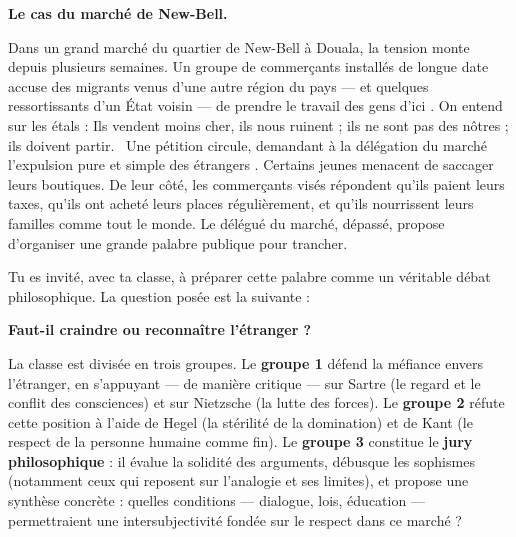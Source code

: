 \documentclass[11pt]{article}
\newcommand{\cle}[1]{{\popxbold\color{popdark}#1}}
\newcounter{popsec}
\newcounter{popsub}
\newcommand{\courssub}[1]{%
  \stepcounter{popsub}%
  \par\vspace{9pt}\noindent{\popxbold\fontsize{11.5}{13}\selectfont\color{popink}{\color{poporange}\thepopsec.\thepopsub}\hspace{6pt}#1}\par\nopagebreak\vspace{4pt}
}
\begin{document}
\courssub{Situation}

\textbf{Le cas du marché de New-Bell.}\par

Dans un grand marché du quartier de New-Bell à Douala, la tension monte depuis plusieurs semaines. Un groupe de commerçants installés de longue date accuse des migrants venus d'une autre région du pays — et quelques ressortissants d'un État voisin — de \guillemotleft prendre le travail des gens d'ici \guillemotright. On entend sur les étals : \guillemotleft Ils vendent moins cher, ils nous ruinent ; ils ne sont pas des nôtres ; ils doivent partir. \guillemotright\ Une pétition circule, demandant à la délégation du marché l'expulsion pure et simple des \guillemotleft étrangers \guillemotright. Certains jeunes menacent de saccager leurs boutiques. De leur côté, les commerçants visés répondent qu'ils paient leurs taxes, qu'ils ont acheté leurs places régulièrement, et qu'ils nourrissent leurs familles comme tout le monde. Le délégué du marché, dépassé, propose d'organiser une grande palabre publique pour trancher.

Tu es invité, avec ta classe, à préparer cette palabre comme un véritable \cle{débat philosophique}. La question posée est la suivante :

\begin{center}
\textbf{\guillemotleft Faut-il craindre ou reconnaître l'étranger ? \guillemotright}
\end{center}

La classe est divisée en trois groupes. Le \textbf{groupe 1} défend la méfiance envers l'étranger, en s'appuyant — de manière critique — sur Sartre (le regard et le conflit des consciences) et sur Nietzsche (la lutte des forces). Le \textbf{groupe 2} réfute cette position à l'aide de Hegel (la stérilité de la domination) et de Kant (le respect de la personne humaine comme fin). Le \textbf{groupe 3} constitue le \textbf{jury philosophique} : il évalue la solidité des arguments, débusque les sophismes (notamment ceux qui reposent sur l'analogie et ses limites), et propose une synthèse concrète : quelles conditions — dialogue, lois, éducation — permettraient une intersubjectivité fondée sur le respect dans ce marché ?

\courssub{Consignes}
\end{document}
